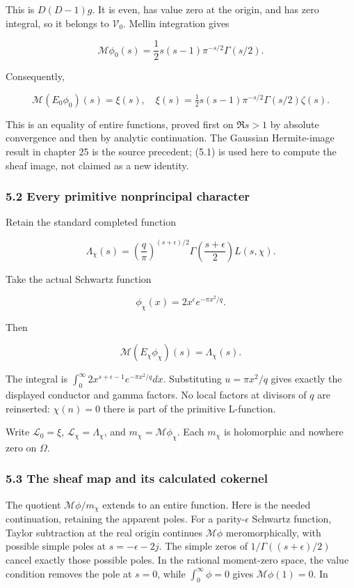 \documentclass[
]{article}
\begin{document}
This is \(D(D-1)g\). It is even, has value zero at the origin, and has
zero integral, so it belongs to \(\mathscr V_0\). Mellin integration
gives

\[
\mathcal M\phi_0(s)=\frac12s(s-1)\pi^{-s/2}\Gamma(s/2).
\]

Consequently,

\[
\boxed{\mathcal M(E_0\phi_0)(s)=\xi(s),\quad
\xi(s)=\tfrac12s(s-1)\pi^{-s/2}\Gamma(s/2)\zeta(s).} \tag{5.1}
\]

This is an equality of entire functions, proved first on \(\Re s>1\) by
absolute convergence and then by analytic continuation. The Gaussian
Hermite-image result in chapter 25 is the source precedent; (5.1) is
used here to compute the sheaf image, not claimed as a new identity.

\subsubsection{5.2 Every primitive nonprincipal
character}\label{every-primitive-nonprincipal-character}

Retain the standard completed function

\[
\Lambda_\chi(s)=\left(\frac q\pi\right)^{(s+\epsilon)/2}
\Gamma\!\left(\frac{s+\epsilon}{2}\right)L(s,\chi).
\]

Take the actual Schwartz function

\[
\phi_\chi(x)=2x^\epsilon e^{-\pi x^2/q}.
\]

Then

\[
\boxed{\mathcal M(E_\chi\phi_\chi)(s)=\Lambda_\chi(s).} \tag{5.2}
\]

The integral is \(\int_0^\infty2x^{s+\epsilon-1}e^{-\pi x^2/q}dx\).
Substituting \(u=\pi x^2/q\) gives exactly the displayed conductor and
gamma factors. No local factors at divisors of \(q\) are reinserted:
\(\chi(n)=0\) there is part of the primitive L-function.

Write \(\mathscr L_0=\xi\), \(\mathscr L_\chi=\Lambda_\chi\), and
\(m_\chi=\mathcal M\phi_\chi\). Each \(m_\chi\) is holomorphic and
nowhere zero on \(\Omega\).

\subsubsection{5.3 The sheaf map and its calculated
cokernel}\label{the-sheaf-map-and-its-calculated-cokernel}

The quotient \(\mathcal M\phi/m_\chi\) extends to an entire function.
Here is the needed continuation, retaining the apparent poles. For a
parity-\(\epsilon\) Schwartz function, Taylor subtraction at the real
origin continues \(\mathcal M\phi\) meromorphically, with possible
simple poles at \(s=-\epsilon-2j\). The simple zeros of
\(1/\Gamma((s+\epsilon)/2)\) cancel exactly those possible poles. In the
rational moment-zero space, the value condition removes the pole at
\(s=0\), while \(\int_0^\infty\phi=0\) gives \(\mathcal M\phi(1)=0\). In
\end{document}
